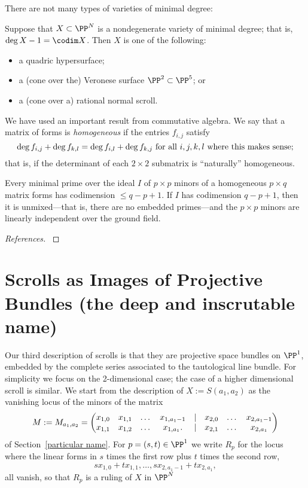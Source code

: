 There are not many types of varieties of minimal degree:

\begin{fact}
Suppose that $X\subset \PP^{N}$ is a nondegenerate variety of minimal degree; that is, 
$\deg X - 1 = \codim X$. Then $X$ is one of the following:
\begin{itemize}
\item a quadric hypersurface;
\item a (cone over the) Veronese surface $\PP^{2}\subset \PP^{5}$; or
\item a (cone over a) rational normal scroll.
\end{itemize}
\end{fact}


We have used an important result from commutative algebra.
We say that a matrix of forms is \emph{homogeneous} if the entries $f_{i,j}$ satisfy
$$
\deg f_{i,j} + \deg f_{k,l} = \deg f_{i,l}+\deg f_{k,j} \hbox{ for all } i,j,k,l \hbox{ where this makes sense;}
$$
that is, if the determinant of each $2\times 2$ submatrix is ``naturally'' homogeneous.

\begin{fact}\label{Macaulay's Theorem} Every minimal prime over the ideal $I$ of $p\times p$ minors of a homogeneous $p\times q$ matrix forms has codimension $\leq q-p+1$. If $I$ has codimension $q-p+1$, then it is unmixed---that is, there are no embedded primes---and the $p\times p$ minors are linearly independent over the ground field.
\end{fact}

\begin{proof}[References] 
\cite[ Theorem *** ]{Ei}
\end{proof}


\section{Scrolls as Images of Projective Bundles (the deep and inscrutable name)}\label{inscrutable name}

Our third description of scrolls is that they are projective space bundles on $\PP^{1}$, embedded by the complete series associated to the tautological line bundle. For simplicity we focus on the 2-dimensional case; the case of a higher dimensional scroll is similar. We start from the description of 
$
X:=S(a_{1}, a_{2})
$
as the vanishing locus of the minors of the matrix
$$
\setcounter{MaxMatrixCols}{20}
M:= M_{a_{1}, a_{2}} = 
\begin{pmatrix}
x_{1,0}&x_{1,1}&\dots&x_{1, a_{1}-1}&|&x_{2,0}&\dots&x_{2, a_{1}-1}\\
x_{1,1}&x_{1,2}&\dots&x_{1, a_{1}}.  &|&x_{2,1}&\dots&x_{2, a_{1}}
\end{pmatrix}
$$
of Section~\ref{particular name}. For $p = (s,t) \in \PP^{1}$ we write
$R_{p}$ for the locus where the linear forms in $s$ times the first row plus $t$ times the second row, 
$$
sx_{1,0}+tx_{1,1}, \dots, sx_{2, a_{1}-1}+ tx_{2, a_{1}},
$$
all vanish, so that $R_{p}$ is a ruling of $X$ in $\PP^{N}$


